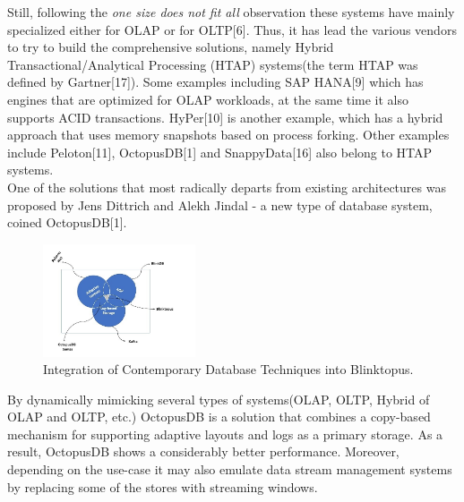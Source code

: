 \documentclass[10pt, conference, compsocconf]{IEEEtran}
\begin{document}
Still, following the \textit{one size does not fit all} observation these systems have mainly specialized either for OLAP or for OLTP[6]. Thus, it has lead the various vendors to try to build the comprehensive solutions, namely Hybrid Transactional/Analytical Processing (HTAP) systems(the term HTAP was defined by Gartner[17]). Some examples including SAP HANA[9] which has engines that are optimized for OLAP workloads, at the same time it also supports ACID transactions. HyPer[10] is another example, which has a hybrid approach that uses memory snapshots based on process forking. Other examples include Peloton[11], OctopusDB[1] and  SnappyData[16] also belong to HTAP systems.  \\
One of the solutions that most radically departs from existing architectures was proposed by Jens Dittrich and Alekh Jindal - a new type of database system, coined OctopusDB[1].
\begin{figure} \includegraphics[width=0.4\textwidth, center]{img/htap.png} 
\caption{Integration of Contemporary Database Techniques into Blinktopus.}
\end{figure}
By dynamically mimicking several types of systems(OLAP, OLTP, Hybrid of OLAP and OLTP, etc.) OctopusDB is a solution that combines a copy-based mechanism for supporting adaptive layouts and logs as a primary storage. As a result, OctopusDB shows a considerably better performance. Moreover, depending on the use-case it may also emulate data stream management systems by replacing some of the stores with streaming windows. 
\end{document}
